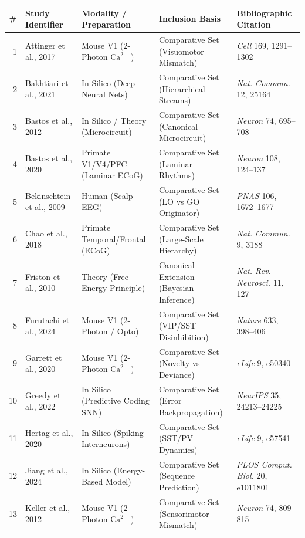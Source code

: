 \documentclass[12pt]{article}
\renewcommand{\arraystretch}{1.06}
\begin{document}
\begingroup
\scriptsize
\renewcommand{\arraystretch}{0.94}
\setlength{\tabcolsep}{2.5pt}
\noindent\begin{tabularx}{\textwidth}{@{}r l p{1.6in} p{1.6in} >{\raggedright\arraybackslash}X@{}}
\toprule
\textbf{\#} & \textbf{Study Identifier} & \textbf{Modality / Preparation} & \textbf{Inclusion Basis} & \textbf{Bibliographic Citation} \\
\midrule
1 & Attinger et al., 2017 & Mouse V1 (2-Photon $\text{Ca}^{2+}$) & Comparative Set (Visuomotor Mismatch) & \emph{Cell} 169, 1291--1302 \\
2 & Bakhtiari et al., 2021 & In Silico (Deep Neural Nets) & Comparative Set (Hierarchical Streams) & \emph{Nat. Commun.} 12, 25164 \\
3 & Bastos et al., 2012 & In Silico / Theory (Microcircuit) & Comparative Set (Canonical Microcircuit) & \emph{Neuron} 74, 695--708 \\
4 & Bastos et al., 2020 & Primate V1/V4/PFC (Laminar ECoG) & Comparative Set (Laminar Rhythms) & \emph{Neuron} 108, 124--137 \\
5 & Bekinschtein et al., 2009 & Human (Scalp EEG) & Comparative Set (LO vs GO Originator) & \emph{PNAS} 106, 1672--1677 \\
6 & Chao et al., 2018 & Primate Temporal/Frontal (ECoG) & Comparative Set (Large-Scale Hierarchy) & \emph{Nat. Commun.} 9, 3188 \\
7 & Friston et al., 2010 & Theory (Free Energy Principle) & Canonical Extension (Bayesian Inference) & \emph{Nat. Rev. Neurosci.} 11, 127 \\
8 & Furutachi et al., 2024 & Mouse V1 (2-Photon / Opto) & Comparative Set (VIP/SST Disinhibition) & \emph{Nature} 633, 398--406 \\
9 & Garrett et al., 2020 & Mouse V1 (2-Photon $\text{Ca}^{2+}$) & Comparative Set (Novelty vs Deviance) & \emph{eLife} 9, e50340 \\
10 & Greedy et al., 2022 & In Silico (Predictive Coding SNN) & Comparative Set (Error Backpropagation) & \emph{NeurIPS} 35, 24213--24225 \\
11 & Hertag et al., 2020 & In Silico (Spiking Interneurons) & Comparative Set (SST/PV Dynamics) & \emph{eLife} 9, e57541 \\
12 & Jiang et al., 2024 & In Silico (Energy-Based Model) & Comparative Set (Sequence Prediction) & \emph{PLOS Comput. Biol.} 20, e1011801 \\
13 & Keller et al., 2012 & Mouse V1 (2-Photon $\text{Ca}^{2+}$) & Comparative Set (Sensorimotor Mismatch) & \emph{Neuron} 74, 809--815 \\

\end{tabularx}
\end{document}
